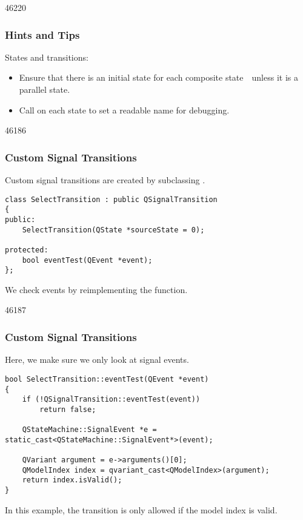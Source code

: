 \begin{slide}{46220}\frametitle{Hints and Tips}

States and transitions:
\begin{itemize}
\item Ensure that there is an initial state for each composite
state~\textemdash~unless it is a parallel state.
\item Call  on each state to set a readable
name for debugging.
\end{itemize}
\end{slide}

\begin{slide}[fragile]{46186}\frametitle{Custom Signal Transitions}

Custom signal transitions are created by subclassing .

\vspace*{-0.5em}
\small
\begin{lstlisting}
class SelectTransition : public QSignalTransition
{
public:
    SelectTransition(QState *sourceState = 0);

protected:
    bool eventTest(QEvent *event);
};
\end{lstlisting}
\normalsize
\vfill
We check events by reimplementing the  function.
\end{slide}

\begin{slide}[fragile]{46187}\frametitle{Custom Signal Transitions}
Here, we make sure we only look at signal events.

\vspace*{-0.5em}
\small
\begin{lstlisting}
bool SelectTransition::eventTest(QEvent *event)
{
    if (!QSignalTransition::eventTest(event))
        return false;

    QStateMachine::SignalEvent *e = static_cast<QStateMachine::SignalEvent*>(event);

    QVariant argument = e->arguments()[0];
    QModelIndex index = qvariant_cast<QModelIndex>(argument);
    return index.isValid();
}
\end{lstlisting}
\normalsize

In this example, the transition is only allowed if the model index is valid.
\end{slide}
